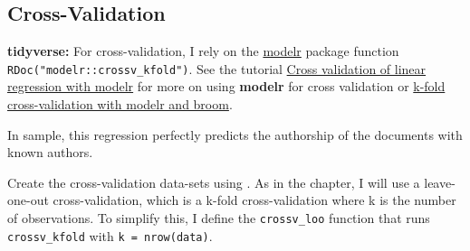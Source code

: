 \documentclass[]{book}
\newenvironment{Shaded}{\begin{snugshade}}{\end{snugshade}}
\newcommand{\KeywordTok}[1]{\textcolor[rgb]{0.13,0.29,0.53}{\textbf{#1}}}
\newcommand{\DataTypeTok}[1]{\textcolor[rgb]{0.13,0.29,0.53}{#1}}
\newcommand{\StringTok}[1]{\textcolor[rgb]{0.31,0.60,0.02}{#1}}
\newcommand{\CommentTok}[1]{\textcolor[rgb]{0.56,0.35,0.01}{\textit{#1}}}
\newcommand{\ControlFlowTok}[1]{\textcolor[rgb]{0.13,0.29,0.53}{\textbf{#1}}}
\newcommand{\OperatorTok}[1]{\textcolor[rgb]{0.81,0.36,0.00}{\textbf{#1}}}
\newcommand{\NormalTok}[1]{#1}
\theoremstyle{definition}
\theoremstyle{definition}
\theoremstyle{definition}
\theoremstyle{remark}
\begin{document}
\subsection{Cross-Validation}\label{cross-validation}

\textbf{tidyverse:} For cross-validation, I rely on the
\href{https://cran.r-project.org/package=modelr}{modelr} package
function \texttt{RDoc("modelr::crossv\_kfold")}. See the tutorial
\href{https://rpubs.com/dgrtwo/cv-modelr}{Cross validation of linear
regression with modelr} for more on using \textbf{modelr} for cross
validation or
\href{https://drsimonj.svbtle.com/k-fold-cross-validation-with-modelr-and-broom}{k-fold
cross-validation with modelr and broom}.

In sample, this regression perfectly predicts the authorship of the
documents with known authors.

\begin{Shaded}
\end{Shaded}

Create the cross-validation data-sets using . As in the chapter, I will
use a leave-one-out cross-validation, which is a k-fold cross-validation
where k is the number of observations. To simplify this, I define the
\texttt{crossv\_loo} function that runs \texttt{crossv\_kfold} with
\texttt{k\ =\ nrow(data)}.

\begin{Shaded}
\end{Shaded}
\end{document}
